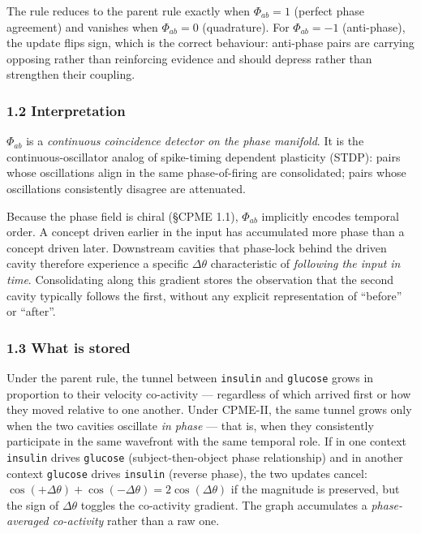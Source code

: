 \documentclass[
  11pt,
  a4paper,
]{article}
\begin{document}
The rule reduces to the parent rule exactly when \(\Phi_{ab} = 1\)
(perfect phase agreement) and vanishes when \(\Phi_{ab} = 0\)
(quadrature). For \(\Phi_{ab} = -1\) (anti-phase), the update flips
sign, which is the correct behaviour: anti-phase pairs are carrying
opposing rather than reinforcing evidence and should depress rather than
strengthen their coupling.

\subsubsection{1.2 Interpretation}\label{interpretation}

\(\Phi_{ab}\) is a \emph{continuous coincidence detector on the phase
manifold}. It is the continuous-oscillator analog of spike-timing
dependent plasticity (STDP): pairs whose oscillations align in the same
phase-of-firing are consolidated; pairs whose oscillations consistently
disagree are attenuated.

Because the phase field is chiral (§CPME 1.1), \(\Phi_{ab}\) implicitly
encodes temporal order. A concept driven earlier in the input has
accumulated more phase than a concept driven later. Downstream cavities
that phase-lock behind the driven cavity therefore experience a specific
\(\Delta \theta\) characteristic of \emph{following the input in time}.
Consolidating along this gradient stores the observation that the second
cavity typically follows the first, without any explicit representation
of ``before'' or ``after''.

\subsubsection{1.3 What is stored}\label{what-is-stored}

Under the parent rule, the tunnel between \texttt{insulin} and
\texttt{glucose} grows in proportion to their velocity co-activity ---
regardless of which arrived first or how they moved relative to one
another. Under CPME-II, the same tunnel grows only when the two cavities
oscillate \emph{in phase} --- that is, when they consistently
participate in the same wavefront with the same temporal role. If in one
context \texttt{insulin} drives \texttt{glucose} (subject-then-object
phase relationship) and in another context \texttt{glucose} drives
\texttt{insulin} (reverse phase), the two updates cancel:
\(\cos(+\Delta\theta) +
\cos(-\Delta\theta) = 2\cos(\Delta\theta)\) if the magnitude is
preserved, but the sign of \(\Delta \theta\) toggles the co-activity
gradient. The graph accumulates a \emph{phase-averaged co-activity}
rather than a raw one.
\end{document}
